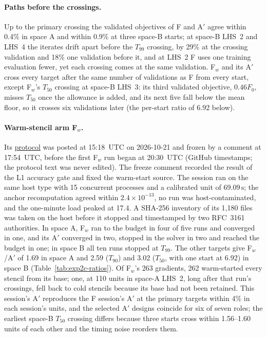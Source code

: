 \documentclass{anvil-paper}
\begin{document}
\paragraph{Paths before the crossings.}
Up to the primary crossing the validated objectives of F and A$'$ agree
within 0.4\% in space A and within 0.9\% at three space-B starts; at
space-B LHS~2 and LHS~4 the iterates drift apart before the $T_{99}$
crossing, by 29\% at the crossing validation and 18\% one validation
before it, and at LHS~2 F uses one training evaluation fewer, yet each
crossing comes at the same validation. F$_w$ and its A$'$ cross every
target after the same number of validations as F from every start, except
F$_w$'s $T_{50}$ crossing at space-B LHS~3: its third validated objective,
$0.46F_0$, misses $T_{50}$ once the allowance is added, and its next five
fall below the mean floor, so it crosses six validations later (the
per-start ratio of 6.92 below).

\paragraph{Warm-stencil arm F$_w$.}
Its \href{https://github.com/rjwalters/geode-fem/issues/1224}{protocol} was
posted at 15:18~UTC on 2026-10-21 and frozen by a comment at 17:54~UTC,
before the first F$_w$ run began at 20:30~UTC (GitHub timestamps; the
protocol text was never edited). The freeze comment recorded the result of
the L1 accuracy gate and fixed the warm-start source. The session ran on the same host type with
15 concurrent processes and a calibrated unit of $69.09\,\mathrm{s}$; the
anchor recomputation agreed within $2.4\times10^{-13}$, no run was
host-contaminated, and the one-minute load peaked at 17.4. A SHA-256
inventory of its 1,180 files was taken on the host before it stopped and
timestamped by two RFC~3161 authorities. In space A, F$_w$ ran to the budget
in four of five runs and converged in one, and its A$'$ converged in two,
stopped in the solver in two and reached the budget in one; in space B all
ten runs stopped at $T_{99}$. The other targets give F$_w$/A$'$ of 1.69 in
space A and 2.59 ($T_{90}$) and 3.02 ($T_{50}$, with one start at 6.92) in
space B (Table~\ref{tab:exp2c-ratios}). Of F$_w$'s 263 gradients, 262
warm-started every stencil from its base; one, at 110 units in space-A
LHS~2, long after that run's crossings, fell back to cold stencils because
its base had not been retained.
This session's A$'$ reproduces the F session's A$'$ at the primary targets
within 4\% in each session's units, and the selected A$'$ designs coincide
for six of seven roles; the earliest space-B $T_{50}$ crossing differs
because three starts cross within 1.56--1.60 units of each other and the
timing noise reorders them.
\end{document}

